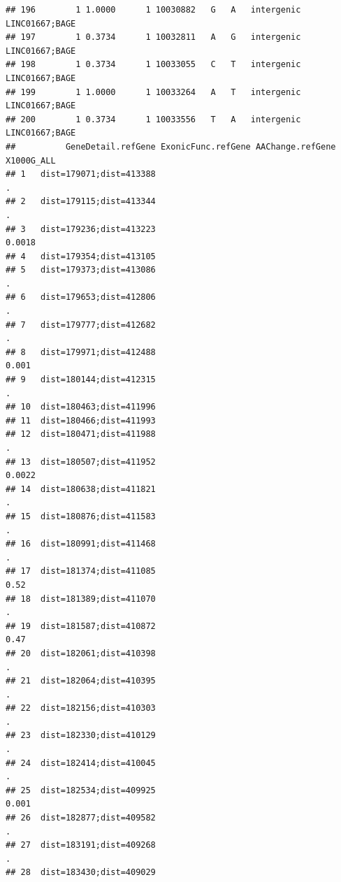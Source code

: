 \documentclass[
]{article}
\begin{document}
\begin{verbatim}
## 196        1 1.0000      1 10030882   G   A   intergenic LINC01667;BAGE
## 197        1 0.3734      1 10032811   A   G   intergenic LINC01667;BAGE
## 198        1 0.3734      1 10033055   C   T   intergenic LINC01667;BAGE
## 199        1 1.0000      1 10033264   A   T   intergenic LINC01667;BAGE
## 200        1 0.3734      1 10033556   T   A   intergenic LINC01667;BAGE
##          GeneDetail.refGene ExonicFunc.refGene AAChange.refGene X1000G_ALL
## 1   dist=179071;dist=413388                                              .
## 2   dist=179115;dist=413344                                              .
## 3   dist=179236;dist=413223                                         0.0018
## 4   dist=179354;dist=413105                                               
## 5   dist=179373;dist=413086                                              .
## 6   dist=179653;dist=412806                                              .
## 7   dist=179777;dist=412682                                              .
## 8   dist=179971;dist=412488                                          0.001
## 9   dist=180144;dist=412315                                              .
## 10  dist=180463;dist=411996                                               
## 11  dist=180466;dist=411993                                               
## 12  dist=180471;dist=411988                                              .
## 13  dist=180507;dist=411952                                         0.0022
## 14  dist=180638;dist=411821                                              .
## 15  dist=180876;dist=411583                                              .
## 16  dist=180991;dist=411468                                              .
## 17  dist=181374;dist=411085                                           0.52
## 18  dist=181389;dist=411070                                              .
## 19  dist=181587;dist=410872                                           0.47
## 20  dist=182061;dist=410398                                              .
## 21  dist=182064;dist=410395                                              .
## 22  dist=182156;dist=410303                                              .
## 23  dist=182330;dist=410129                                              .
## 24  dist=182414;dist=410045                                              .
## 25  dist=182534;dist=409925                                          0.001
## 26  dist=182877;dist=409582                                              .
## 27  dist=183191;dist=409268                                              .
## 28  dist=183430;dist=409029                                               

\end{verbatim}
\end{document}
